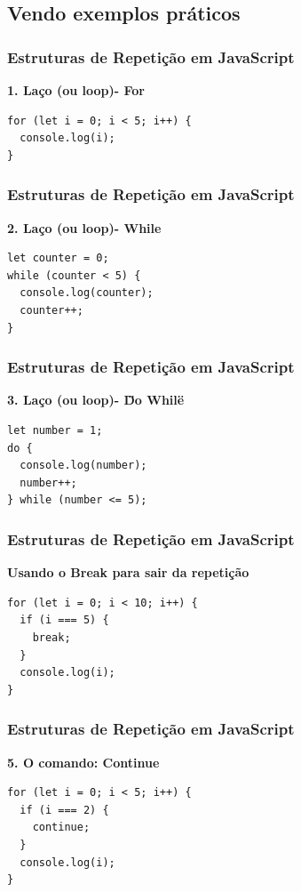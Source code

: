 \documentclass[13pt, xcolor={dvipsnames,svgnames}, portuguese]{beamer}
\begin{document}
\subsection{Vendo exemplos práticos}
\begin{frame}[fragile]
\frametitle{Estruturas de Repetição em JavaScript}

\textbf{1. Laço (ou loop)- For}

\begin{verbatim}
for (let i = 0; i < 5; i++) {
  console.log(i);
}
\end{verbatim}

\end{frame}
\begin{frame}[fragile]
\frametitle{Estruturas de Repetição em JavaScript}

\textbf{2. Laço (ou loop)- While}

\begin{verbatim}
let counter = 0;
while (counter < 5) {
  console.log(counter);
  counter++;
}
\end{verbatim}

\end{frame}
\begin{frame}[fragile]
\frametitle{Estruturas de Repetição em JavaScript}

\textbf{3. Laço (ou loop)- \"Do While\"}

\begin{verbatim}
let number = 1;
do {
  console.log(number);
  number++;
} while (number <= 5);
\end{verbatim}

\end{frame}
\begin{frame}[fragile]
\frametitle{Estruturas de Repetição em JavaScript}

\textbf{Usando o Break para sair da repetição }

\begin{verbatim}
for (let i = 0; i < 10; i++) {
  if (i === 5) {
    break;
  }
  console.log(i);
}
\end{verbatim}

\end{frame}
\begin{frame}[fragile]
\frametitle{Estruturas de Repetição em JavaScript}

\textbf{5. O comando: Continue}

\begin{verbatim}
for (let i = 0; i < 5; i++) {
  if (i === 2) {
    continue;
  }
  console.log(i);
}
\end{verbatim}

\end{frame}
\end{document}
